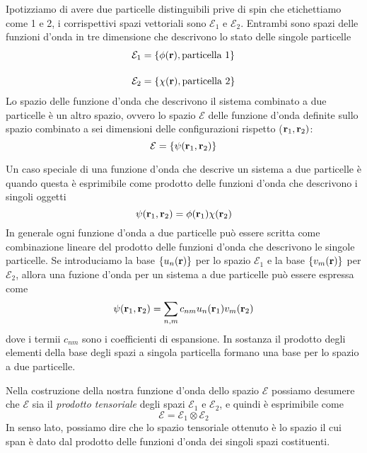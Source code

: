 Ipotizziamo di avere due particelle distinguibili prive di spin che etichettiamo come 1 e 2, i corrispettivi spazi vettoriali sono $\mathcal{E}_1$ e $\mathcal{E}_2$. Entrambi sono spazi delle funzioni d'onda in tre dimensione 
che descrivono lo stato delle singole particelle
\begin{align*}
	&\mathcal{E}_1 = \{\phi(\bold{r}), \text{particella 1}\}\\[0.4cm]
	&\mathcal{E}_2 = \{\chi(\bold{r}), \text{particella 2}\}
\end{align*}
Lo spazio delle funzione d'onda che descrivono il sistema combinato a due particelle \`e un altro spazio, ovvero lo spazio $\mathcal{E}$ delle funzione d'onda definite sullo spazio combinato a sei dimensioni delle configurazioni rispetto ($\bold{r}_1,\bold{r}_2)$:
\begin{equation*}
	\mathcal{E} = \{\psi(\bold{r}_1,\bold{r}_2) \}
\end{equation*}

Un caso speciale di una funzione d'onda che descrive un sistema a due particelle \`e quando questa \`e esprimibile come prodotto delle funzioni d'onda che descrivono i singoli oggetti
\begin{equation*}
	\psi(\bold{r}_1,\bold{r}_2) = \phi(\bold{r}_1)\chi(\bold{r}_2)
\end{equation*}
 In generale ogni funzione d'onda a due particelle pu\`o essere scritta come combinazione lineare del prodotto delle funzioni d'onda che descrivono le singole particelle. Se introduciamo la base $\{u_n(\bold{r})\}$ per lo spazio $\mathcal{E}_1$ e la base $\{v_m(\bold{r})\}$ per $\mathcal{E}_2$, allora una fuzione d'onda per un sistema a due particelle pu\`o essere espressa come 
 \begin{equation*}
 	\psi(\bold{r}_1,\bold{r}_{2}) = \sum_{n,m}c_{nm}u_{n}(\bold{r}_1)v_{m}(\bold{r}_2)
 \end{equation*}
 dove i termii $c_{nm}$ sono i coefficienti di espansione. In sostanza il prodotto degli elementi della base degli spazi a singola particella formano una base per lo spazio a due particelle. 
 
 Nella costruzione della nostra funzione d'onda dello spazio $\mathcal{E}$ possiamo desumere che $\mathcal{E}$ sia il \textit{prodotto tensoriale} degli spazi $\mathcal{E}_1$ e $\mathcal{E}_2$, e quindi \`e esprimibile come
 \begin{equation*}
 	\mathcal{E} = \mathcal{E}_1 \otimes \mathcal{E}_2
 \end{equation*}
 In senso lato, possiamo dire che lo spazio tensoriale ottenuto \`e lo spazio il cui span \`e dato dal prodotto delle funzioni d'onda dei singoli spazi costituenti.
 
